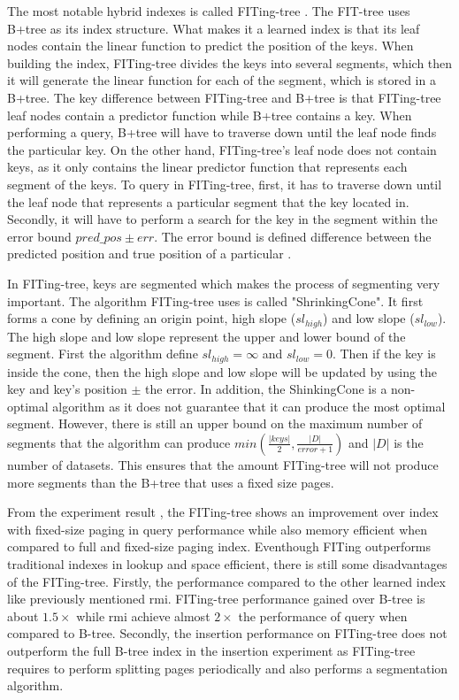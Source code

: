 The most notable hybrid indexes is called \textsf{FITing-tree} \cite{fittingtree}. The FIT-tree uses B+tree as its index structure. What makes it a learned index is that its leaf nodes contain the linear function to predict the position of the keys. When building the index, FITing-tree divides the keys into several segments, which then it will generate the linear function for each of the segment, which is stored in a B+tree. The key difference between FITing-tree and B+tree is that FITing-tree leaf nodes contain a predictor function while B+tree contains a key. When performing a query, B+tree will have to traverse down until the leaf node finds the particular key. On the other hand, FITing-tree's leaf node does not contain keys, as it only contains the linear predictor function that represents each segment of the keys. To query in FITing-tree, first, it has to traverse down until the leaf node that represents a particular segment that the key located in. Secondly, it will have to perform a search for the key in the segment within the error bound $pred\_pos \pm err$. The error bound is defined difference between the predicted position and true position of a particular \cite{fittingtree}. 

In FITing-tree, keys are segmented which makes the process of segmenting very important. The algorithm FITing-tree uses is called "\textsf{ShrinkingCone}". It first forms a cone by defining an origin point, high slope ($sl_{high}$) and low slope ($sl_{low}$). The high slope and low slope represent the upper and lower bound of the segment. First the algorithm define $sl_{high} = \infty$ and $sl_{low} = 0$. Then if the key is inside the cone, then the high slope and low slope will be updated by using the key and key's position $\pm$ the \textsf{error}. In addition, the \textsf{ShinkingCone} is a non-optimal algorithm as it does not guarantee that it can produce the most optimal segment. However, there is still an upper bound on the maximum number of segments that the algorithm can produce $min(\frac{|keys|}{2}, \frac{|D|}{error+1})$ and $|D|$ is the number of datasets. This ensures that the amount FITing-tree will not produce more segments than the B+tree that uses a fixed size pages\cite{fittingtree}. 

From the experiment result \cite{fittingtree}, the FITing-tree shows an improvement over index with fixed-size paging in query performance while also memory efficient when compared to full and fixed-size paging index. Eventhough FITing outperforms traditional indexes in lookup and space efficient, there is still some disadvantages of the FITing-tree. Firstly, the performance compared to the other learned index like previously mentioned \acrshort{rmi}. FITing-tree performance gained over B-tree is about $1.5\times$ while \acrshort{rmi} achieve almost $2\times$ the performance of query when compared to B-tree. Secondly, the insertion performance on FITing-tree does not outperform the full B-tree index in the insertion experiment \cite{fittingtree} as FITing-tree requires to perform splitting pages periodically and also performs a segmentation algorithm. 

